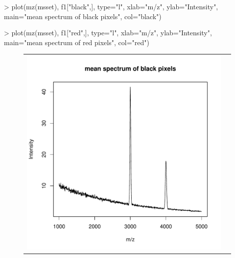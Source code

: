 \documentclass[a4paper]{article}
\begin{document}
\begin{Schunk}
\begin{Sinput}
> plot(mz(msset), f1["black",], type="l", xlab="m/z", ylab="Intensity", main="mean spectrum of black pixels", col="black")
\end{Sinput}
\end{Schunk}
\begin{Schunk}
\begin{Sinput}
> plot(mz(msset), f1["red",], type="l", xlab="m/z", ylab="Intensity", main="mean spectrum of red pixels", col="red")
\end{Sinput}
\end{Schunk}
\begin{figure}
\begin{center}
\begin{tabular}{cc}
\includegraphics{Cardinal-demo-076}
&

\end{tabular}
\end{center}
\end{figure}
\end{document}
